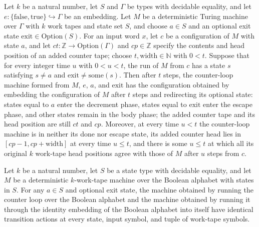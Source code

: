 \begin{lemma}
\label{Turing.counter_body}
\leanok
{}
Let $k$ be a natural number, let $S$ and $\Gamma$ be types with decidable equality, and
let $e:\{\mathrm{false},\mathrm{true}\}\hookrightarrow\Gamma$ be an embedding. Let $M$
be a deterministic Turing machine over $\Gamma$ with $k$ work tapes and state set $S$,
and choose $a\in S$ and an optional exit state $\mathrm{exit}\in\mathrm{Option}(S)$. For
an input word $x$, let $c$ be a configuration of $M$ with state $a$, and let
$ct:\mathbb{Z}\to\mathrm{Option}(\Gamma)$ and $cp\in\mathbb{Z}$ specify the contents and
head position of an added counter tape; choose $t,\mathrm{width}\in\mathbb{N}$ with
$0<t$. Suppose that for every integer time $u$ with $0<u<t$, the run of $M$ from $c$ has
a state $s$ satisfying $s\ne a$ and $\mathrm{exit}\ne\mathrm{some}(s)$. Then after $t$
steps, the counter-loop machine formed from $M$, $e$, $a$, and $\mathrm{exit}$ has the
configuration obtained by embedding the configuration of $M$ after $t$ steps and
redirecting its optional state: states equal to $a$ enter the decrement phase, states
equal to $\mathrm{exit}$ enter the escape phase, and other states remain in the body
phase; the added counter tape and its head position are still $ct$ and $cp$. Moreover,
at every time $u<t$ the counter-loop machine is in neither its done nor escape state,
its added counter head lies in $[cp-1,cp+\mathrm{width}]$ at every time $u\le t$, and
there is some $u\le t$ at which all its original $k$ work-tape head positions agree with
those of $M$ after $u$ steps from $c$.
\end{lemma}

\begin{lemma}
\label{Turing.counter_refl_agree}
\leanok
{}
Let $k$ be a natural number, let $S$ be a state type with decidable equality, and let
$M$ be a deterministic $k$-work-tape machine over the Boolean alphabet with states in
$S$. For any $a\in S$ and optional exit state, the machine obtained by running the
counter loop over the Boolean alphabet and the machine obtained by running it through
the identity embedding of the Boolean alphabet into itself have identical transition
actions at every state, input symbol, and tuple of work-tape symbols.
\end{lemma}

